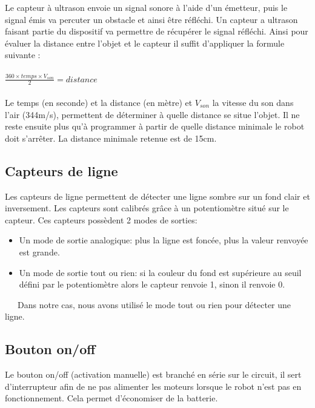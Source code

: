         Le capteur à ultrason envoie un signal sonore à l'aide d'un émetteur, puis le signal émis va percuter un obstacle et ainsi être réfléchi. Un capteur a ultrason faisant partie du dispositif va permettre de récupérer le signal réfléchi. Ainsi pour évaluer la distance entre l'objet et le capteur il suffit d'appliquer la formule suivante : \\ \\$\frac{360 \times temps \times V_{son}}{2} = distance$ \\ \\Le temps (en seconde) et la distance (en mètre) et $V_{son}$ la vitesse du son dans l'air (344m/s), permettent de déterminer à quelle distance se situe l'objet. Il ne reste ensuite plus qu'à programmer à partir de quelle distance minimale le robot doit s'arrêter. La distance minimale retenue est de 15cm.


    \subsection{Capteurs de ligne} 

        Les capteurs de ligne permettent de détecter une ligne sombre sur un fond clair et inversement. Les capteurs sont calibrés grâce à un potentiomètre situé sur le capteur. Ces capteurs possèdent 2 modes de sorties:
        
        \begin{itemize}
            \item Un mode de sortie analogique: plus la ligne est foncée, plus la valeur renvoyée est grande.
            \item Un mode de sortie tout ou rien: si la couleur du fond est supérieure au seuil défini par le potentiomètre alors le capteur renvoie 1, sinon il renvoie 0.
        \end{itemize} 
        \vspace{5mm}
        \ \ \ Dans notre cas, nous avons utilisé le mode tout ou rien pour détecter une ligne. 

    \subsection{Bouton on/off}
    
        Le bouton on/off (activation manuelle) est branché en série sur le circuit, il sert d'interrupteur afin de ne pas alimenter les moteurs lorsque le robot n'est pas en fonctionnement. Cela permet d'économiser de la batterie. 

